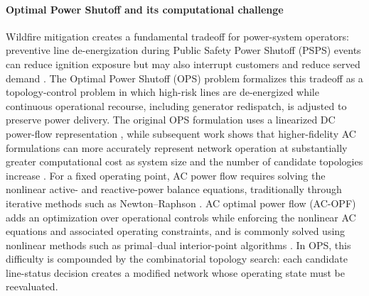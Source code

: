 \documentclass{article}
\begin{document}
\paragraph{Optimal Power Shutoff and its computational challenge}
Wildfire mitigation creates a fundamental tradeoff for power-system operators:
preventive line de-energization during Public Safety Power Shutoff (PSPS) events
can reduce ignition exposure but may also interrupt customers and reduce served
demand \cite{Huang2023ARO}. The Optimal Power Shutoff (OPS) problem formalizes
this tradeoff as a topology-control problem in which high-risk lines are
de-energized while continuous operational recourse, including generator
redispatch, is adjusted to preserve power delivery. The original OPS formulation
uses a linearized DC power-flow representation \cite{9305959}, while subsequent
work shows that higher-fidelity AC formulations can more accurately represent
network operation at substantially greater computational cost as system size and the number of
candidate topologies increase
\cite{Rhodes2023LongST}. For a fixed operating point, AC power flow requires
solving the nonlinear active- and reactive-power balance equations, traditionally
through iterative methods such as Newton--Raphson \citep{4073219}. AC optimal power flow (AC-OPF) adds an optimization over operational controls while enforcing the nonlinear AC equations and associated operating constraints, and is commonly solved using nonlinear methods such as primal--dual interior-point algorithms \citep{Wchter2006OnTI}. In OPS, this
difficulty is compounded by the combinatorial topology search: each candidate
line-status decision creates a modified network whose operating state must be
reevaluated. 
\end{document}
